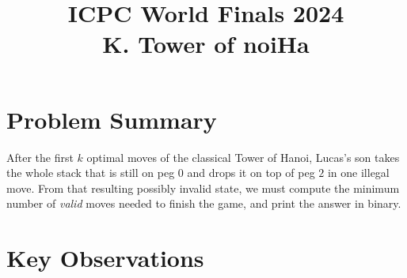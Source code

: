 \documentclass[11pt]{article}
\title{ICPC World Finals 2024\\K. Tower of noiHa}
\author{}
\date{}
\begin{document}
\maketitle

\section*{Problem Summary}

After the first $k$ optimal moves of the classical Tower of Hanoi, Lucas's son takes the whole stack that is still on peg $0$ and drops it on top of peg $2$ in one illegal move. From that resulting possibly invalid state, we must compute the minimum number of \emph{valid} moves needed to finish the game, and print the answer in binary.

\section*{Key Observations}
\end{document}
